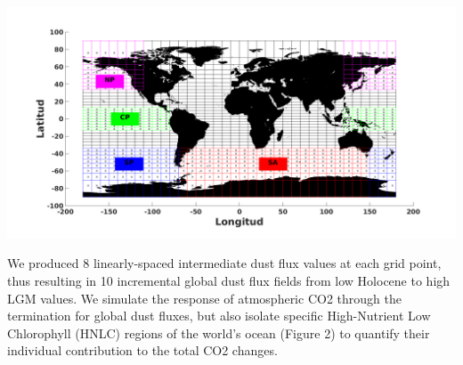 \documentclass[landscape,a0paper,fontscale=0.33]{baposter} %
\begin{document}
\begin{poster}
{\begin{center}
\includegraphics[width=1\linewidth]{mapa.png}
\end{center}

We produced 8 linearly-spaced intermediate dust flux values at each grid point, thus resulting in 10 incremental global dust flux fields from low Holocene to high LGM values.
We simulate the response of atmospheric CO2 through the termination for global dust fluxes, but also isolate specific High-Nutrient Low Chlorophyll (HNLC) regions of the world's ocean 
(Figure 2) to quantify their individual contribution to the total CO2 changes.
}


\headerbox{$\begin{array}{l}\vspace{-1cm}\\
{$pCO_2$ reduction obtained by cGENIE simulation for dust fields}\\ \text{ varying from Holocene to LGM}
\end{array}$
}{name=results,boxheaderheight=1.1cm,column=2,span=2,row=0}{

\begin{multicols}{2}


\end{multicols}}
\end{poster}
\end{document}
